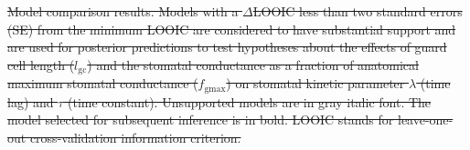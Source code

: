 \documentclass[
  letterpaper,
  DIV=11,
  numbers=noendperiod]{scrartcl}
\newcommand{\fgmax}{$f_\mathrm{gmax}$}
\newcommand{\gcl}{$l_\mathrm{gc}$}
\providecommand{\DIFdeltex}[1]{{\protect\color{red}\sout{#1}}}                      %
\providecommand{\DIFdelbegin}{} %
\providecommand{\DIFdelFL}[1]{\DIFdel{#1}} %
\providecommand{\DIFdel}[1]{\texorpdfstring{\DIFdeltex{#1}}{}} %
\newcommand{\DIFscaledelfig}{0.5}
\newlength{\DIFdelgraphicswidth} %
\newlength{\DIFdelgraphicsheight} %
\newcommand{\DIFdelincludegraphics}[2][]{%
\sbox{\DIFdelgraphicsbox}{\DIFOincludegraphics[#1]{#2}}%
\settoboxwidth{\DIFdelgraphicswidth}{\DIFdelgraphicsbox} %
\settoboxtotalheight{\DIFdelgraphicsheight}{\DIFdelgraphicsbox} %
\scalebox{\DIFscaledelfig}{%
\parbox[b]{\DIFdelgraphicswidth}{\usebox{\DIFdelgraphicsbox}\\[-\baselineskip] \rule{\DIFdelgraphicswidth}{0em}}\llap{\resizebox{\DIFdelgraphicswidth}{\DIFdelgraphicsheight}{%
\setlength{\unitlength}{\DIFdelgraphicswidth}%
\begin{picture}(1,1)%
\thicklines\linethickness{2pt} %
{\color[rgb]{1,0,0}\put(0,0){\framebox(1,1){}}}%
{\color[rgb]{1,0,0}\put(0,0){\line( 1,1){1}}}%
{\color[rgb]{1,0,0}\put(0,1){\line(1,-1){1}}}%
\end{picture}%
}\hspace*{3pt}}} %
} %
\DeclareRobustCommand{\DIFdelbegin}{\DIFOdelbegin \let\includegraphics\DIFdelincludegraphics} %
\begin{document}
\DIFdelbegin %

{%
\DIFdelFL{Model comparison results. Models with a
\(\Delta\)LOOIC less than two standard errors (SE) from the minimum
LOOIC are considered to have substantial support and are used for
posterior predictions to test hypotheses about the effects of guard cell
length (\gcl) and the stomatal conductance as a fraction of anatomical
maximum stomatal conductance (\fgmax) on stomatal kinetic parameter
\(\lambda\) (time lag) and \(\tau\) (time constant). Unsupported models
are in gray italic font. The model selected for subsequent inference is
in bold. LOOIC stands for leave-one-out cross-validation information
criterion.}}

\end{document}
